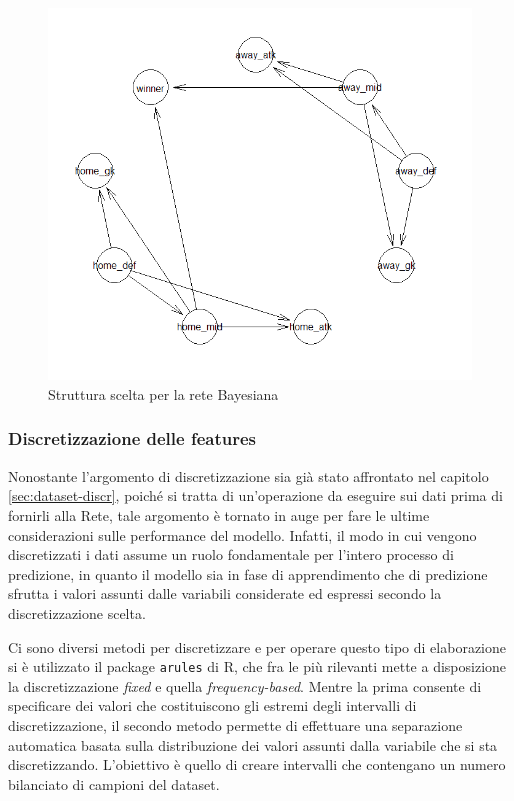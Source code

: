 \documentclass[hidelinks, 12pt]{article}
\begin{document}
\begin{figure}[H]
	\centering
	\includegraphics[scale=0.6]{images/05_02_hc_bin_bl.png}
	\caption[Struttura scelta per la rete Bayesiana]{Struttura scelta per la rete Bayesiana}
	\label{img:hc-bin-bl_2}
\end{figure}


\subsubsection{Discretizzazione delle features}
\label{sec:perf-discret}

Nonostante l'argomento di discretizzazione sia già stato affrontato nel capitolo \ref{sec:dataset-discr}, poiché si tratta di un'operazione da eseguire sui dati prima di fornirli alla Rete, tale argomento è tornato in auge per fare le ultime considerazioni sulle performance del modello. Infatti, il modo in cui vengono discretizzati i dati assume un ruolo fondamentale per l'intero processo di predizione, in quanto il modello sia in fase di apprendimento che di predizione sfrutta i valori assunti dalle variabili considerate ed espressi secondo la discretizzazione scelta.

Ci sono diversi metodi per discretizzare e per operare questo tipo di elaborazione si è utilizzato il package \texttt{arules} di R, che fra le più rilevanti mette a disposizione la discretizzazione \textit{fixed} e quella \textit{frequency-based}. Mentre la prima consente di specificare dei valori che costituiscono gli estremi degli intervalli di discretizzazione, il secondo metodo permette di effettuare una separazione automatica basata sulla distribuzione dei valori assunti dalla variabile che si sta discretizzando. L'obiettivo è quello di creare intervalli che contengano un numero bilanciato di campioni del dataset.
\end{document}
